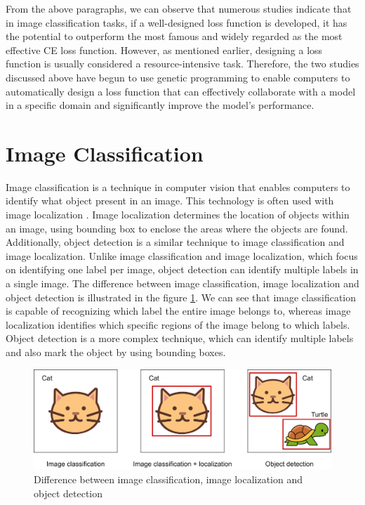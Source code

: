 \begin{ZhChapter}
    From the above paragraphs, we can observe that numerous studies indicate that in image classification tasks, if a well-designed loss function is developed, it has the potential to outperform the most famous and widely regarded as the most effective CE loss function. However, as mentioned earlier, designing a loss function is usually considered a resource-intensive task. Therefore, the two studies discussed above have begun to use genetic programming to enable computers to automatically design a loss function that can effectively collaborate with a model in a specific domain and significantly improve the model's performance.

    \section{Image Classification}
    Image classification is a technique in computer vision that enables computers to identify what object present in an image. This technology is often used with image localization \cite{sattler2011fast}. Image localization determines the location of objects within an image, using bounding box \cite{he2019boundingboxregressionuncertainty} to enclose the areas where the objects are found. Additionally, object detection \cite{zhao2019object} is a similar technique to image classification and image localization. Unlike image classification and image localization, which focus on identifying one label per image, object detection can identify multiple labels in a single image. The difference between image classification, image localization and object detection is illustrated in the figure \ref{fig: IC&OD}. We can see that image classification is capable of recognizing which label the entire image belongs to, whereas image localization identifies which specific regions of the image belong to which labels. Object detection is a more complex  technique, which can identify multiple labels and also mark the object by using bounding boxes.
    \begin{figure}[htbp]
        \centering
        \includegraphics[width = 1\textwidth]{image/Image classification & Object detection.png}
        \caption{Difference between image classification, image localization and object detection}
        \label{fig: IC&OD}
    \end{figure}


\end{ZhChapter}
